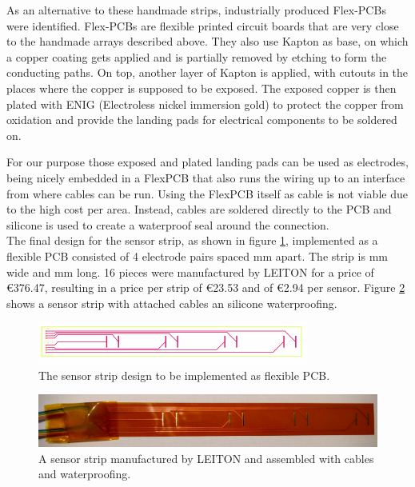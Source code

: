 As an alternative to these handmade strips, industrially produced Flex-PCBs were identified. Flex-PCBs are flexible printed circuit boards that are very close to the handmade arrays described above. They also use Kapton as base, on which a copper coating gets applied and is partially removed by etching to form the conducting paths. On top, another layer of Kapton is applied, with cutouts in the places where the copper is supposed to be exposed. The exposed copper is then plated with ENIG (Electroless nickel immersion gold) to protect the copper from oxidation and provide the landing pads for electrical components to be soldered on.

For our purpose those exposed and plated landing pads can be used as electrodes, being nicely embedded in a FlexPCB that also runs the wiring up to an interface from where cables can be run. Using the FlexPCB itself as cable is not viable due to the high cost per area. Instead, cables are soldered directly to the PCB and silicone is used to create a waterproof seal around the connection.\\

The final design for the sensor strip, as shown in figure \ref{fig:fpcbd}, implemented as a flexible PCB consisted of 4 electrode pairs spaced \unit[50]{mm} apart. The strip is \unit[25]{mm} wide and \unit[220]{mm} long. 16 pieces were manufactured by LEITON for a price of \euro{376.47}, resulting in a price per strip of \euro{23.53} and of \euro{2.94} per sensor. Figure \ref{fig:fpcbp} shows a sensor strip with attached cables an silicone waterproofing.

\begin{figure}
	\begin{center}
		\includegraphics[width=\textwidth]{images/fpcbd.pdf} 
		\caption{The sensor strip design to be implemented as flexible PCB.}
		\label{fig:fpcbd}
	\end{center}
\end{figure}

\begin{figure}
	\begin{center}
		\includegraphics[width=\textwidth]{images/fpcbp.jpg} 
		\caption{A sensor strip manufactured by LEITON and assembled with cables and waterproofing.}
		\label{fig:fpcbp}
	\end{center}
\end{figure}

